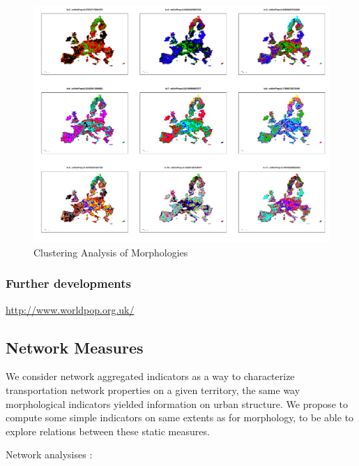 \begin{figure}
\hspace{-3cm}
\includegraphics[angle=90,width=1.7\textwidth,height=\textheight]{Figures/PartII/Empirical/Static/Density/clust_k3-11}
\caption[Clustering Analysis of Morphologies]{Clustering Analysis of Morphologies}
\end{figure}






\subsubsection{Further developments}

\cite{10.1371/journal.pone.0107042}

\url{http://www.worldpop.org.uk/}



\subsection{Network Measures}

We consider network aggregated indicators as a way to characterize transportation network properties on a given territory, the same way morphological indicators yielded information on urban structure. We propose to compute some simple indicators on same extents as for morphology, to be able to explore relations between these static measures.

Network analysises : \cite{louf2014typology}


